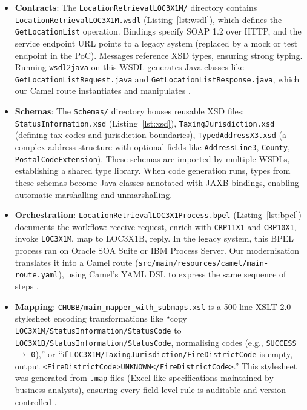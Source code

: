\documentclass[11pt]{article}
\begin{document}
\begin{itemize}
  \item \textbf{Contracts}: The \texttt{LocationRetrievalLOC3X1M/} directory contains \texttt{LocationRetrievalLOC3X1M.wsdl} (Listing~\ref{lst:wsdl}), which defines the \texttt{GetLocationList} operation. Bindings specify SOAP 1.2 over HTTP, and the service endpoint URL points to a legacy system (replaced by a mock or test endpoint in the PoC). Messages reference XSD types, ensuring strong typing. Running \texttt{wsdl2java} on this WSDL generates Java classes like \texttt{GetLocationListRequest.java} and \texttt{GetLocationListResponse.java}, which our Camel route instantiates and manipulates \cite{wsdl-spec}.

  \item \textbf{Schemas}: The \texttt{Schemas/} directory houses reusable XSD files: \texttt{StatusInformation.xsd} (Listing~\ref{lst:xsd}), \texttt{TaxingJurisdiction.xsd} (defining tax codes and jurisdiction boundaries), \texttt{TypedAddressX3.xsd} (a complex address structure with optional fields like \texttt{AddressLine3}, \texttt{County}, \texttt{PostalCodeExtension}). These schemas are imported by multiple WSDLs, establishing a shared type library. When code generation runs, types from these schemas become Java classes annotated with JAXB bindings, enabling automatic marshalling and unmarshalling.

  \item \textbf{Orchestration}: \texttt{LocationRetrievalLOC3X1Process.bpel} (Listing~\ref{lst:bpel}) documents the workflow: receive request, enrich with \texttt{CRP11X1} and \texttt{CRP10X1}, invoke \texttt{LOC3X1M}, map to LOC3X1B, reply. In the legacy system, this BPEL process ran on Oracle SOA Suite or IBM Process Server. Our modernisation translates it into a Camel route (\texttt{src/main/resources/camel/main-route.yaml}), using Camel's YAML DSL to express the same sequence of steps \cite{bpel-spec}.

  \item \textbf{Mapping}: \texttt{CHUBB/main\_mapper\_with\_submaps.xsl} is a 500-line XSLT 2.0 stylesheet encoding transformations like ``copy \texttt{LOC3X1M/StatusInformation/StatusCode} to \texttt{LOC3X1B/StatusInformation/StatusCode}, normalising codes (e.g., \texttt{SUCCESS} $\to$ \texttt{0}),'' or ``if \texttt{LOC3X1M/TaxingJurisdiction/FireDistrictCode} is empty, output \texttt{<FireDistrictCode>UNKNOWN</FireDistrictCode>}.'' This stylesheet was generated from \texttt{.map} files (Excel-like specifications maintained by business analysts), ensuring every field-level rule is auditable and version-controlled \cite{xslt-spec}.


\end{itemize}
\end{document}
